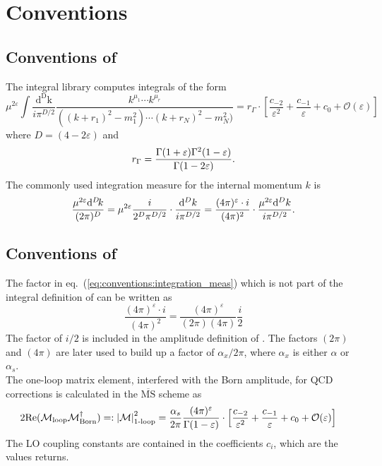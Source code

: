 \chapter{Conventions}
\label{sec:conventions}

\section{Conventions of \golemVC}
The integral library \golemVC{} computes integrals of the form
\begin{equation}
\mu^{2\varepsilon}\int\frac{\mathrm{d^D k}}{i\pi^{D/2}}\frac{k^{\mu_1}\cdots k^{\mu_r}}{((k+r_1)^2-m_1^2)\cdots(k+r_N)^2-m_N^2)}
=r_\Gamma\cdot\left[\frac{c_{-2}}{\varepsilon^2}+\frac{c_{-1}}{\varepsilon}+c_0
+{\mathcal{O}}(\varepsilon)\right]
\end{equation}
where $D=(4-2\varepsilon)$ and
\begin{equation}
r_\Gamma=\frac{\Gamma(1+\varepsilon)\Gamma^2(1-\varepsilon)}{%
   \Gamma(1-2\varepsilon)}.
\end{equation}
The commonly used integration measure for the internal momentum $k$ is
\begin{equation}\label{eq:conventions:integration_meas}
\frac{\mu^{2\varepsilon}\diff[D]k}{(2\pi)^D}
=\mu^{2\varepsilon}\frac{i}{2^D\pi^{D/2}}\cdot\frac{{\mathrm d}^Dk}{i\pi^{D/2}}
=\frac{(4\pi)^\varepsilon \cdot i}{(4\pi)^2}\cdot%
 \frac{\mu^{2\varepsilon}{\mathrm d}^Dk}{i\pi^{D/2}}.
\end{equation}

\section{Conventions of \gosamv}
The factor in eq.~(\ref{eq:conventions:integration_meas}) which is not part of the integral definition of \golemVC{} can be written as
\begin{equation}
\frac{(4\pi)^\varepsilon \cdot i}{(4\pi)^2}=
\frac{(4\pi)^\varepsilon}{(2\pi)(4\pi)}\frac{i}{2}
\end{equation}
The factor of $i/2$ is included in the amplitude definition of \gosamv{}. The factors $(2\pi)$ and $(4\pi)$ are later used to build up a factor of $\alpha_x/2\pi$, where $\alpha_x$ is either $\alpha$ or $\alpha_s$.\\

The one-loop matrix element, interfered with the Born amplitude, for QCD corrections is calculated in the $\overline{\mathrm{MS}}$ scheme as
\begin{align}\label{eq:Conventions:nlo_matrix_element}
2{\mathrm{Re}}({\mathcal{M}}_{\mathrm{loop}}{\mathcal{M}}_{\mathrm{Born}}^\dagger)=:\left\vert\mathcal{M}\right\vert^2_{\text{1-loop}}
    &= \frac{\alpha_s}{2\pi}\frac{(4\pi)^\varepsilon}{\Gamma(1-\varepsilon)}\cdot\left[
      \frac{c_{-2}}{\varepsilon^2}+\frac{c_{-1}}{\varepsilon}+c_0+{\mathcal{O}}(\varepsilon)\right]
\end{align}
The LO coupling constants are contained in the coefficients $c_i$, which are the values \gosamv{} returns.\\


